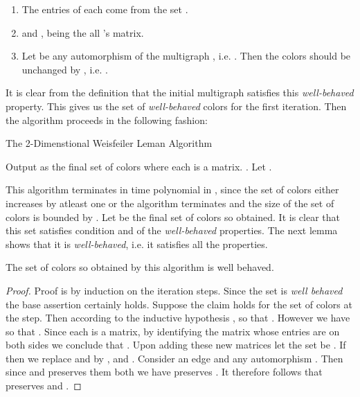  \begin{enumerate}
	 \item The entries of each  come from the set .

	 \item 
	  and ,  being the all 's matrix.

	 
	 \item Let  be any automorphism of the multigraph , i.e. . Then the colors should be unchanged by , i.e. .
		 
 \end{enumerate}

 
 It is clear from the definition that the initial multigraph  satisfies this \emph{well-behaved} property. This gives us the set of \emph{well-behaved} colors for the first iteration. Then the algorithm proceeds in the following
 fashion:

 \begin{algorithm}[H]
	 \caption{The 2-Dimenstional Weisfeiler Leman Algorithm}\label{wl}
 \begin{algorithmic}
     \State 
     \State 
     \State Output  as the final set of colors
	 \Else 
	         \State  where each  is a  matrix.
		 \State . Let .
		 \While {}
		 \State 
		 \EndWhile
	\EndIf
     \EndWhile
 \end{algorithmic}
\end{algorithm}

This algorithm terminates in time polynomial in , since the set of colors either increases by atleast one or the algorithm terminates and the size of the set of colors is bounded by .
Let  be the final set of colors so obtained. It is clear that this set satisfies condition  and  of the \emph{well-behaved} properties. The next lemma shows that it is \emph{well-behaved}, 
 i.e. it satisfies all the properties.

 
 \begin{lemma}\label{wellbehaved}
	 The set of colors  so obtained by this algorithm is well behaved.
\end{lemma}

\begin{proof}
	Proof is by induction on the iteration steps. Since the set  is \emph{well behaved} the base assertion certainly holds. Suppose the claim holds for the set of colors  at the  step. 
	Then according to the inductive hypothesis , so that . However we have
	 so that . Since each  is a  matrix, by identifying the matrix whose entries are  on both sides we conclude that .
	Upon adding these new matrices let the set be . If  then we replace 
	 and  by ,  and 
	. Consider an edge  and any automorphism . Then since  and  preserves them both we have  preserves . It therefore follows that 
	preserves  and .
\end{proof}

